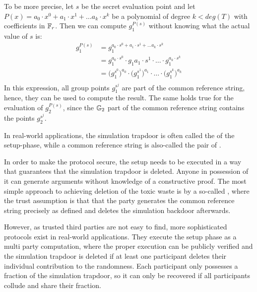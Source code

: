 To be more precise, let $s$ be the secret evaluation point and let $P(x)=a_0\cdot x^0 + a_1\cdot x^1 + \ldots a_k\cdot x^k$ be a polynomial of degree $k<deg(T)$ with coefficients in $\mathbb{F}_r$. Then we can compute $g_1^{P(s)}$ without knowing what the actual value of $s$ is:
\begin{align*}
g_1^{P(s)} & = g_1^{a_0\cdot s^0 + a_1\cdot s^1 + \ldots a_k\cdot s^k} \\
 & = g_1^{a_0\cdot s^0} \cdot g_1{a_1\cdot s^1} \cdot \ldots \cdot g_1^{a_k\cdot s^k}\\
 & = \Big(g_1^{s^0}\Big)^{a_0} \cdot \Big(g_1^{s^1}\Big)^{a_1} \cdot \ldots \cdot \Big(g_1^{s^k}\Big)^{a_k}\\
\end{align*}
In this expression, all group points $g_1^{s^j}$ are part of the common reference string, hence, they can be used to compute the result. The same holds true for the evaluation of $g_2^{P(s)}$, since the $\mathbb{G}_2$ part of the common reference string contains the points $g_2^{s^j}$. 

In real-world applications, the simulation trapdoor is often called the  of the setup-phase, while a common reference string is also-called the pair of . 

In order to make the protocol secure, the setup needs to be executed in a way that  guarantees that the simulation trapdoor is deleted. Anyone in possession of it can generate arguments without knowledge of a constructive proof. The most simple approach to achieving deletion of the toxic waste is by a so-called , where the trust assumption is that that the party generates the common reference string precisely as defined and deletes the simulation backdoor afterwards.

However, as trusted third parties are not easy to find, more sophisticated protocols exist in real-world applications. They execute the setup phase as a multi party computation, where the proper execution can be publicly verified and the simulation trapdoor is deleted if at least one participant deletes their individual contribution to the randomness. Each participant only possesses a fraction of the simulation trapdoor, so it can only be recovered if all participants collude and share their fraction.

